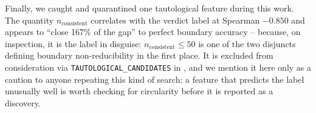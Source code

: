 Finally, we caught and quarantined one tautological feature during this
work. The quantity $n_{\mathrm{consistent}}$ correlates with the verdict
label at Spearman $-0.850$ and appears to ``close 167\% of the gap'' to
perfect boundary accuracy -- because, on inspection, it is the label in
disguise: $n_{\mathrm{consistent}} \le 50$ is one of the two disjuncts
defining boundary non-reducibility in the first place. It is excluded from
consideration via \texttt{TAUTOLOGICAL\_CANDIDATES} in
, and we mention it here only as a caution to anyone repeating this
kind of search: a feature that predicts the label unusually well is worth
checking for circularity before it is reported as a discovery.
